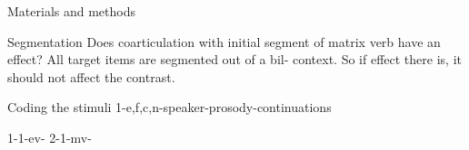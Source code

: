 Materials and methods

Segmentation 
Does coarticulation with initial segment of matrix verb have an effect? All target items are segmented out of a bil- context. So if effect there is, it should not affect the contrast. 

Coding the stimuli 
1-{e,f,c,n}-speaker-prosody-continuations

1-1-ev-
2-1-mv-
